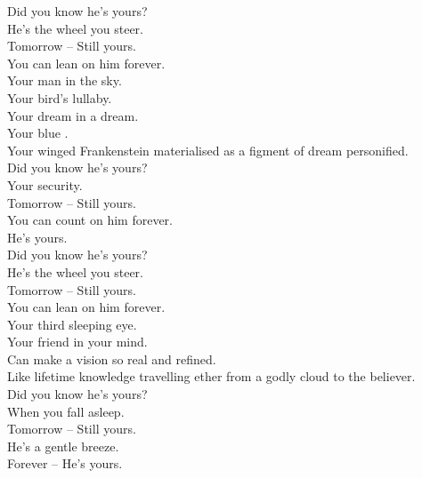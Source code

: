 
\label{album:butterfly-3000}




Did you know he's yours? \\
He's the wheel you steer. \\
Tomorrow -- Still yours. \\
You can lean on him forever. \\

Your man in the sky. \\
Your bird's lullaby. \\
Your dream in a dream. \\
Your blue . \\
Your winged Frankenstein materialised as a figment of dream personified. \\

Did you know he's yours? \\
Your security. \\
Tomorrow -- Still yours. \\
You can count on him forever. \\
He's yours. \\

Did you know he's yours? \\
He's the wheel you steer. \\
Tomorrow -- Still yours. \\
You can lean on him forever. \\

Your third sleeping eye. \\
Your friend in your mind. \\
Can make a vision so real and refined. \\
Like lifetime knowledge travelling ether from a godly cloud to the believer. \\

Did you know he's yours? \\
When you fall asleep. \\
Tomorrow -- Still yours. \\
He's a gentle breeze. \\
Forever -- He's yours. \\

